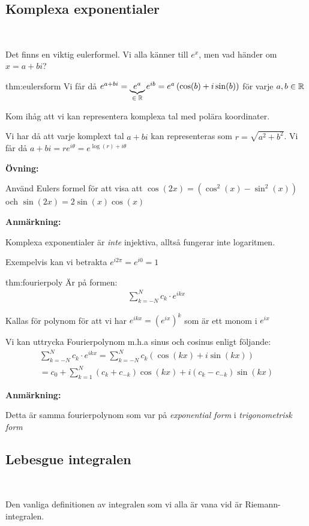 \subsection{Komplexa exponentialer}\hfill\\\par
\noindent Det finns en viktig eulerformel. Vi alla känner till $e^x$, men vad händer om $x = a+bi$?
\par\bigskip
\begin{theo}{thm:eulersform}
  Vi får då $e^{a+bi} = \underbrace{e^a}_{\text{$\in\mathbb{R}$}}e^{ib} = e^a\left(\cos(b)+i\sin(b)\right)$ för varje $a,b\in\mathbb{R}$\par
\end{theo}
\par\bigskip
\noindent Kom ihåg att vi kan representera komplexa tal med polära koordinater.\par
\noindent Vi har då att varje komplext tal $a+bi$ kan representeras som $r = \sqrt{a^2+b^2}$. Vi får då $a+bi = re^{i\theta} = e^{\log(r)+i\theta}$
\par\bigskip
\noindent\textbf{Övning:}\par
\noindent Använd Eulers formel för att visa att $\cos(2x) = \left(\cos^2(x)-\sin^2(x)\right)$ och $\sin(2x) = 2\sin(x)\cos(x)$
\par\bigskip
\noindent\textbf{Anmärkning:}\par
\noindent Komplexa exponentialer är \textit{inte} injektiva, alltså fungerar inte logaritmen.\par
\noindent Exempelvis kan vi betrakta $e^{i2\pi} = e^{i0} = 1$
\par\bigskip
\begin{theo}[Fourierpolynomial]{thm:fourierpoly}
  Är på formen:
  \begin{equation*}
    \begin{gathered}
      \sum_{k=-N}^{N}c_k\cdot e^{ikx}
    \end{gathered}
  \end{equation*}
  \par\bigskip
  \noindent Kallas för polynom för att vi har $e^{ikx} = (e^{ix})^k$ som är ett monom i $e^{ix}$
\end{theo}
\par\bigskip
\noindent Vi kan uttrycka Fourierpolynom m.h.a sinus och cosinus enligt följande:
\begin{equation*}
  \begin{gathered}
      \sum_{k=-N}^{N}c_k\cdot e^{ikx} = \sum_{k=-N}^{N}c_k\left(\cos(kx)+i\sin(kx)\right)\\
      = c_0 +\sum_{k=1}^{N}(c_k+c_{-k})\cos(kx)+i(c_k-c_{-k})\sin(kx)
  \end{gathered}
\end{equation*}
\par\bigskip
\noindent\textbf{Anmärkning:}\par
\noindent Detta är samma fourierpolynom som var på \textit{exponential form} i \textit{trigonometrisk form}
\par\bigskip
\subsection{Lebesgue integralen}\hfill\\\par
\noindent Den vanliga definitionen av integralen som vi alla är vana vid är Riemann-integralen.
